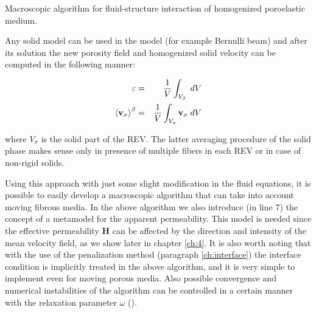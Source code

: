 \begin{algorithm}[H]
	\caption{Macroscopic algorithm for fluid-structure interaction of homogenized poroelastic medium.}
	\label{algo:vans_elastic}
\end{algorithm}

\vspace{0.5cm}
Any solid model can be used in the model (for example Bernulli beam) and after its solution the new porosity field and homogenized solid velocity can be computed in the following manner:


\begin{eqnarray}
	\varepsilon &=& \dfrac{1}{V} \int_{V_\beta} \; dV  \nonumber \\
{\left< \textbf{v}_{\sigma} \right>}^{\beta} &=& \dfrac{1}{V} \int_{V_{\sigma}} \textbf{v}_{\sigma} \; dV \nonumber 
\end{eqnarray}

where $V_{\sigma}$ is the solid part of the REV.
The latter averaging procedure of the solid phase makes sense only in presence of multiple fibers in each REV or in case of non-rigid solids.

Using this approach with just some slight modification in the fluid equations, it is possible to easily develop a macroscopic algorithm that can take into account moving fibrous media.
In the above algorithm we also introduce (in line 7) the concept of a metamodel for the apparent permeability. This model is needed since the effective permeability $\mathbf{H}$ can be affected by the direction and intensity of the mean velocity field, as we show later in chapter \ref{ch:4}.
It is also worth noting that with the use of the penalization method (paragraph \ref{ch:interface}) the interface condition is implicitly treated in the above algorithm, and it is very simple to implement even for moving porous media.
Also possible convergence and numerical instabilities of the algorithm can be controlled in a certain manner with the relaxation parameter $\omega$ (\citet{irons1969aitken}).

